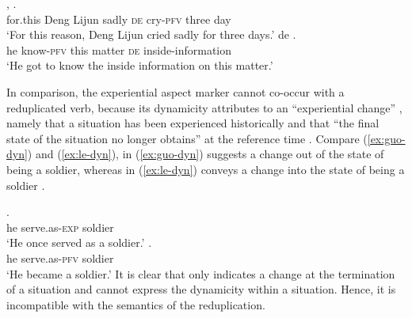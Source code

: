 \settowidth{}

\ea
  \ea\label{ex:cry}
    \gll {},       .\\
    for.this Deng Lijun sadly \textsc{de} cry-\textsc{pfv} three day\\ 
    \glt `For this reason, Deng Lijun cried sadly for three days.'
  \ex\label{ex:know}
    \gll {}    de .\\
    he know-\textsc{pfv} this matter \textsc{de} inside-information\\ 
    \glt `He got to know the inside information on this matter.'
  \z
\z

In comparison, the experiential aspect marker  cannot co\hyp{}occur with a reduplicated verb, 
because its dynamicity attributes to an ``experiential change'' \citep[148]{XiaoMcEnery2004}, 
namely that a situation has been experienced historically and that ``the final state of the situation no longer obtains'' at the reference time \citep[144]{XiaoMcEnery2004}. 
Compare (\ref{ex:guo-dyn}) and (\ref{ex:le-dyn}),  in (\ref{ex:guo-dyn}) suggests a change out of the state of being a soldier, 
whereas  in (\ref{ex:le-dyn}) conveys a change into the state of being a soldier \citep[149]{XiaoMcEnery2004}.

\ea
  \ea\label{ex:guo-dyn}
    \gll {}  .\\
    he serve.as-\textsc{exp} soldier\\ 
    \glt `He once served as a soldier.'
  \ex\label{ex:le-dyn}
    \gll {}  .\\
    he serve.as-\textsc{pfv} soldier\\ 
    \glt `He became a soldier.'
  \z
\z
It is clear that  only indicates a change at the termination of a situation and cannot express the dynamicity within a situation.
Hence, it is incompatible with the semantics of the reduplication.


